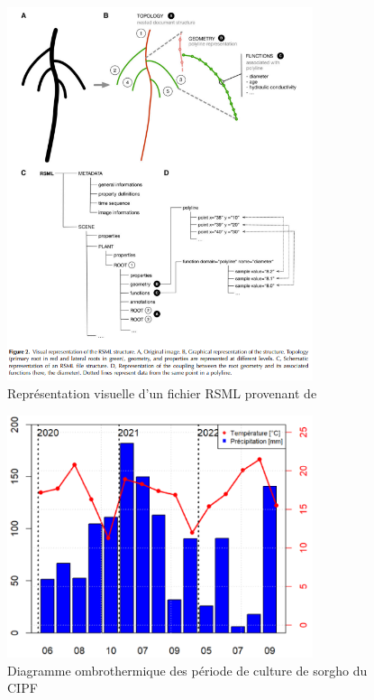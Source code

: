 \label{an:RSML}
\begin{figure}[ht]
\centering
\includegraphics[width=0.8\textwidth]{Image/RSML.png}
\caption{Représentation visuelle d'un fichier RSML provenant de \cite{lobet_root_2015}}
\end{figure}

\newpage

\label{an:aerial}
\begin{figure}[ht]
\centering
\includegraphics[width=0.8\textwidth]{Image/ombrothermique.png}
\caption{Diagramme ombrothermique des période de culture de sorgho du CIPF}
\end{figure}

